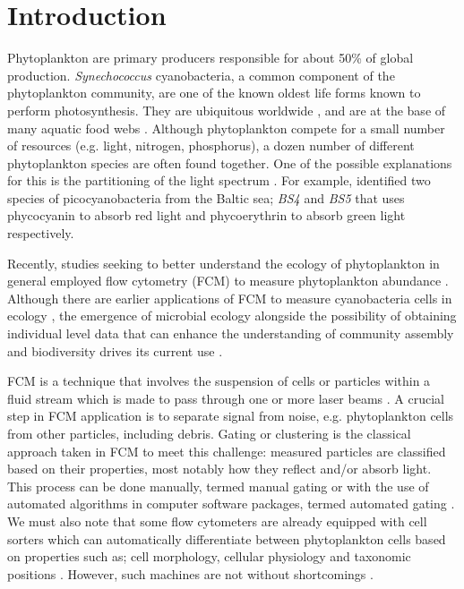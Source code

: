 \documentclass[a4paper,12pt]{extarticle}
\begin{document}
\maketitle

\doublespacing

\section*{Introduction}
Phytoplankton are primary producers responsible for about 50\% of global production. \emph{Synechococcus} cyanobacteria, a common component of the phytoplankton community, are one of the known oldest life forms known to perform photosynthesis. They are ubiquitous worldwide \citep{Dvorak:2004}, and are at the base of many aquatic food webs \citep{Kirk:1994}. Although phytoplankton compete for a small number of resources (e.g. light, nitrogen, phosphorus), a dozen number of different phytoplankton species are often found together. One of the possible explanations for this is the partitioning of the light spectrum \citep{Stopm:2004}. For example, \cite{Stopm:2004} identified two species of picocyanobacteria from the Baltic sea; \emph{BS4} and \emph{BS5} that uses phycocyanin to absorb red light and phycoerythrin to absorb green light respectively.

Recently, studies seeking to better understand the ecology of phytoplankton in general employed flow cytometry (FCM) to measure phytoplankton abundance \citep{Pomati:2013, Stopm:2007, Fontana:2018}. Although there are earlier applications of FCM to measure cyanobacteria cells in ecology \citep{Trask:1982a, Berglund:1988}, the emergence of microbial ecology alongside the possibility of obtaining individual level data that can enhance the understanding of community assembly and biodiversity drives its current use \citep{Fontana:2014a}. 

FCM is a technique that involves the suspension of cells or particles within a fluid stream which is made to pass through one or more laser beams \citep{ONeill:2013}. A crucial step in FCM application is to separate signal from noise, e.g. phytoplankton cells from other particles, including debris. Gating or clustering is the classical approach taken in FCM to meet this challenge: measured particles are classified based on their properties, most notably how they reflect and/or absorb light. This process can be done manually, termed manual gating or with the use of automated algorithms in computer software packages, termed automated gating \citep{ONeill:2013}. We must also note that some flow cytometers are already equipped with cell sorters which can automatically differentiate between phytoplankton cells based on properties such as; cell morphology, cellular physiology and taxonomic positions \citep{Ibrahim:2007}. However, such machines are not without shortcomings \citep{Sinigalliano:2009}. 
\end{document}
